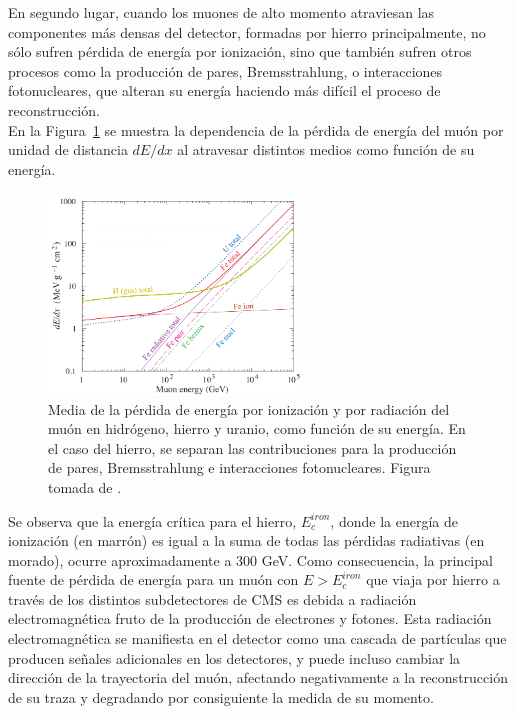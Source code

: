 En segundo lugar, cuando los muones de alto momento atraviesan las componentes m\'as densas del detector, formadas por hierro principalmente, no s\'olo sufren p\'erdida de energ\'ia por ionizaci\'on, sino que tambi\'en sufren otros procesos como la producci\'on de pares, Bremsstrahlung, o interacciones fotonucleares, que alteran su energ\'ia haciendo m\'as dif\'icil el proceso de reconstrucci\'on. \\
En la Figura~\ref{fig:dEdX} se muestra la dependencia de la p\'erdida de energ\'ia del mu\'on por unidad de distancia $dE/dx$ al atravesar distintos medios como funci\'on de su energ\'ia. 

\begin{figure}[h]
\centering
\includegraphics[width=0.60\textwidth]{figures/dEdx.png}
\caption{Media de la p\'erdida de energ\'ia por ionizaci\'on y por radiaci\'on del mu\'on en hidr\'ogeno, hierro y uranio, como funci\'on de su energ\'ia. En el caso del hierro, se separan las contribuciones para la producci\'on de pares, Bremsstrahlung e interacciones fotonucleares. Figura tomada de \cite{Tanabashi:2018oca}.}
\label{fig:dEdX}        
\end{figure}

Se observa que la energ\'ia cr\'itica para el hierro, $E^{iron}_{c}$, donde la energ\'ia de ionizaci\'on (en marr\'on) es igual a la suma de todas las p\'erdidas radiativas (en morado), ocurre aproximadamente a 300 GeV. Como consecuencia, la principal fuente de p\'erdida de energ\'ia para un mu\'on con $E>E^{iron}_{c}$ que viaja por hierro a trav\'es de los distintos subdetectores de CMS es debida a radiaci\'on electromagn\'etica fruto de la producci\'on de electrones y fotones. Esta radiaci\'on electromagn\'etica se manifiesta en el detector como una cascada de part\'iculas que producen se\~nales adicionales en los detectores, y puede incluso cambiar la direcci\'on de la trayectoria del mu\'on, afectando negativamente a la reconstrucci\'on de su traza y degradando por consiguiente la medida de su momento. \\

